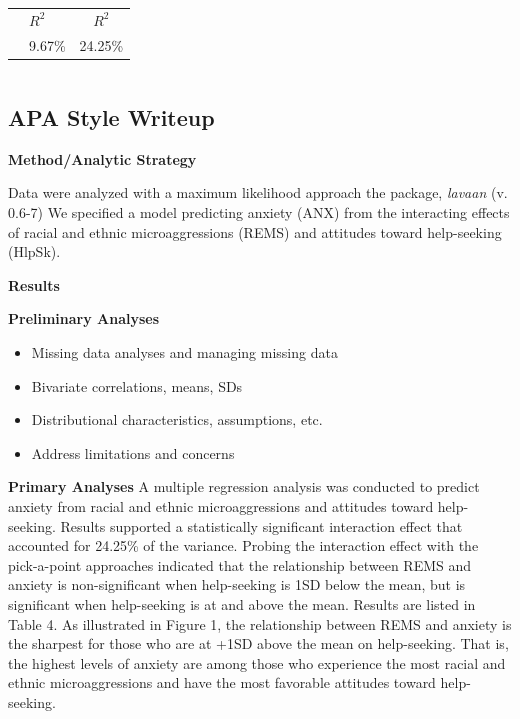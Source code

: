 \documentclass[
  english,
]{book}
\providecommand{\tightlist}{%
  \setlength{\itemsep}{0pt}\setlength{\parskip}{0pt}}
\begin{document}
\begin{longtable}[]{@{}llc@{}}
\toprule
& & \\
\midrule
\endhead
& \(R^2\) & \(R^2\) \\
& 9.67\% & 24.25\% \\
\bottomrule
\end{longtable}

\begin{longtable}[]{@{}l@{}}
\toprule
 \\
\midrule
\endhead
\bottomrule
\end{longtable}

\hypertarget{apa-style-writeup-3}{%
\subsection{APA Style Writeup}\label{apa-style-writeup-3}}

\textbf{Method/Analytic Strategy}

Data were analyzed with a maximum likelihood approach the package, \emph{lavaan} (v. 0.6-7) We specified a model predicting anxiety (ANX) from the interacting effects of racial and ethnic microaggressions (REMS) and attitudes toward help-seeking (HlpSk).

\textbf{Results}

\textbf{Preliminary Analyses}

\begin{itemize}
\tightlist
\item
  Missing data analyses and managing missing data
\item
  Bivariate correlations, means, SDs
\item
  Distributional characteristics, assumptions, etc.
\item
  Address limitations and concerns
\end{itemize}

\textbf{Primary Analyses}
A multiple regression analysis was conducted to predict anxiety from racial and ethnic microaggressions and attitudes toward help-seeking. Results supported a statistically significant interaction effect that accounted for 24.25\% of the variance. Probing the interaction effect with the pick-a-point approaches indicated that the relationship between REMS and anxiety is non-significant when help-seeking is 1SD below the mean, but is significant when help-seeking is at and above the mean. Results are listed in Table 4. As illustrated in Figure 1, the relationship between REMS and anxiety is the sharpest for those who are at +1SD above the mean on help-seeking. That is, the highest levels of anxiety are among those who experience the most racial and ethnic microaggressions and have the most favorable attitudes toward help-seeking.
\end{document}
